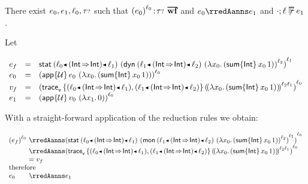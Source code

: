 \begin{theorem}\label{A-incomplete-monitoring}
  There exist\/ $e_0,e_1,\ell_0,{\tau{\scriptstyle ?}}$
  such that\/ $\fwellformedO{\obars{\sexpr_0}{\sowner_0}}{\stoptional}$
  and\/ $\sexpr_0 \rredAanns \sexpr_1$
  and\/ $\cdot; \sowner \not \sWSOP \sexpr_1$.
\end{theorem}
\begin{lamportproof}
{\newcommand{\thetype}{(\tfun{\tint}{\tint})}
  \newcommand{\thefun}{\efun{\svar_0}{(\esum{\tint}{\svar_0}{1})}}
 \newcommand{\theargval}{\efun{\svar_1}{0}}
 \newcommand{\theexprA}{\estab{\obnd{\sowner_0}{\thetype}{\sowner_1}}{\obars{\edynb{\obnd{\sowner_1}{\thetype}{\sowner_2}}{\obars{\thefun}{\sowner_2}}}{\sowner_1}}}
  \newcommand{\theexprB}{\obars{\eapp{\tdyn}{\sexpr_0}{(\thefun)}}{\sowner_0}}

  Let\/

  $\begin{array}{lll}
   \sexpr_f & \eeq & \theexprA\\
    \sexpr_0 & \eeq & \theexprB \\
    \svalue_f & \eeq & \obars{\ehist{\eset{\obnd{\sowner_0}{\thetype}{\sowner_1},
                \obnd{\sowner_1}{\thetype}{\sowner_2}}}{\obbars{\thefun}{\fconcat{\sowner_2}{\sowner_1}}}}{\sowner_0}\\
    \sexpr_1 & \eeq &
    \obars{\eapp{\tdyn}{\svalue_0}{(\theargval)}}{\sowner_0} 
  \end{array}$
 
   \smallskip
  With a straight-forward application of the reduction rules we obtain:

  \(\begin{array}[t]{l@{~}l}
    \obars{\sexpr_f}{\sowner_0}
    & \rredAanns \obars{\estab{\obnd{\sowner_0}{\thetype}{\sowner_1}}{\obars{\emon{\obnd{\sowner_1}{\thetype}{\sowner_2}}{\obars{\thefun}{\sowner_2}}}{\sowner_1}}}{\sowner_0}
    \\
    & \rredAanns \obars{\ehist{\eset{\obnd{\sowner_0}{\thetype}{\sowner_1}, \obnd{\sowner_1}{\thetype}{\sowner_2}}}{\obbars{\thefun}{\fconcat{\sowner_2}{\sowner_1}}}}{\sowner_0}
    \\
    & \eeq \svalue_f
    \\
    \zerowidth{\mbox{therefore}}
    \\
    \sexpr_0
    & \rredAanns \sexpr_1 
  \end{array}\)}
\end{lamportproof}

